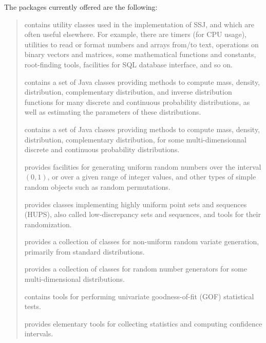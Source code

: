 
\begin{latexonly} %

The packages currently offered are the following:
%
\begin{verse}
  contains utility classes used in the implementation of SSJ,
  and which are often useful elsewhere.
  For example, there are timers (for CPU usage),
  utilities to read or format numbers and arrays from/to text,
  operations on binary vectors and matrices,
  some mathematical functions and constants,
  root-finding tools,
  facilities for SQL database interface, and so on.

  contains a set of Java classes providing methods to compute mass,
  density, distribution, complementary distribution,
  and inverse distribution functions for many discrete and continuous
  probability distributions, as well as estimating the parameters of
  these distributions.

  contains a set of Java classes providing methods to compute mass,
  density, distribution, complementary distribution,
  for some multi-dimensionnal discrete and continuous
  probability distributions.

  provides facilities for generating uniform random numbers over the
  interval $(0,1)$, or over a given range of integer values, and other
  types of simple random objects such as random permutations.

 provides classes implementing highly uniform point sets and
 sequences (HUPS), also called low-discrepancy sets and sequences,
 and  tools for their randomization.

  provides a collection of classes for non-uniform random variate
  generation, primarily from standard distributions.

  provides a collection of classes for
  random number generators for some multi-dimensional distributions.

  contains tools for performing univariate goodness-of-fit
  (GOF) statistical tests.

  provides elementary tools for collecting statistics
  and computing confidence intervals.


\end{verse}
\end{latexonly}
